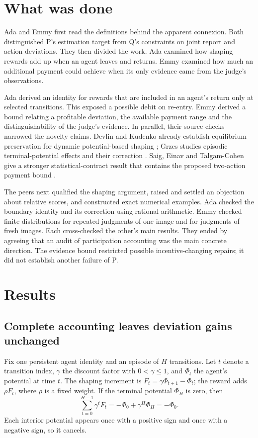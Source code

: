 \documentclass[11pt]{article}
\begin{document}
\section{What was done}

Ada and Emmy first read the definitions behind the apparent connexion. Both distinguished P's estimation
target from Q's constraints on joint report and action deviations. They then divided the work. Ada examined
how shaping rewards add up when an agent leaves and returns. Emmy examined how much an additional payment
could achieve when its only evidence came from the judge's observations.

Ada derived an identity for rewards that are included in an agent's return only at selected transitions. This
exposed a possible debit on re-entry. Emmy derived a bound relating a profitable deviation, the available
payment range and the distinguishability of the judge's evidence. In parallel, their source checks narrowed
the novelty claims. Devlin and Kudenko already establish equilibrium preservation for dynamic potential-based
shaping \cite{devlin}; Grzes studies episodic terminal-potential effects and their correction \cite{grzes}.
Saig, Einav and Talgam-Cohen give a stronger statistical-contract result that contains the proposed two-action
payment bound \cite{saig}.

The peers next qualified the shaping argument, raised and settled an objection about relative scores, and
constructed exact numerical examples. Ada checked the boundary identity and its correction using rational
arithmetic. Emmy checked finite distributions for repeated judgments of one image and for judgments of fresh
images. Each cross-checked the other's main results. They ended by agreeing that an audit of participation
accounting was the main concrete direction. The evidence bound restricted possible incentive-changing repairs;
it did not establish another failure of P.

\section{Results}

\subsection{Complete accounting leaves deviation gains unchanged}

Fix one persistent agent identity and an episode of \(H\) transitions. Let \(t\) denote a transition index,
\(\gamma\) the discount factor with \(0<\gamma\leq1\), and \(\Phi_t\) the agent's potential at time \(t\). The
shaping increment is \(F_t=\gamma\Phi_{t+1}-\Phi_t\); the reward adds \(\rho F_t\), where \(\rho\) is a fixed
weight. If the terminal potential \(\Phi_H\) is zero, then
\[
\sum_{t=0}^{H-1}\gamma^t F_t
=-\Phi_0+\gamma^H\Phi_H=-\Phi_0.
\]
Each interior potential appears once with a positive sign and once with a negative sign, so it cancels.
\end{document}
